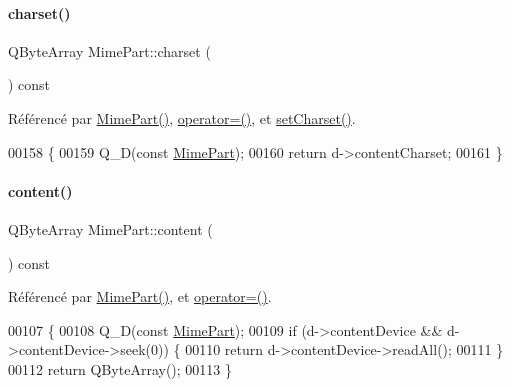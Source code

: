 \paragraph{\texorpdfstring{charset()}{charset()}}
{\footnotesize\ttfamily Q\+Byte\+Array Mime\+Part\+::charset (\begin{DoxyParamCaption}{ }\end{DoxyParamCaption}) const}



Référencé par \hyperlink{class_simple_mail_1_1_mime_part_a22b25ea7c1bb06d1b73f4c43103bfa1e}{Mime\+Part()}, \hyperlink{class_simple_mail_1_1_mime_part_a34320574f8cba9dbe03cca99e3fca942}{operator=()}, et \hyperlink{class_simple_mail_1_1_mime_part_a3ec15032385ee5687112e2e808d6170f}{set\+Charset()}.


\begin{DoxyCode}
00158 \{
00159     Q\_D(\textcolor{keyword}{const} \hyperlink{class_simple_mail_1_1_mime_part}{MimePart});
00160     \textcolor{keywordflow}{return} d->contentCharset;
00161 \}
\end{DoxyCode}
\mbox{\label{class_simple_mail_1_1_mime_part_a22fd1bc02bce6c9655d879fd71620bf5}} 
\paragraph{\texorpdfstring{content()}{content()}}
{\footnotesize\ttfamily Q\+Byte\+Array Mime\+Part\+::content (\begin{DoxyParamCaption}{ }\end{DoxyParamCaption}) const}



Référencé par \hyperlink{class_simple_mail_1_1_mime_part_a22b25ea7c1bb06d1b73f4c43103bfa1e}{Mime\+Part()}, et \hyperlink{class_simple_mail_1_1_mime_part_a34320574f8cba9dbe03cca99e3fca942}{operator=()}.


\begin{DoxyCode}
00107 \{
00108     Q\_D(\textcolor{keyword}{const} \hyperlink{class_simple_mail_1_1_mime_part}{MimePart});
00109     \textcolor{keywordflow}{if} (d->contentDevice && d->contentDevice->seek(0)) \{
00110         \textcolor{keywordflow}{return} d->contentDevice->readAll();
00111     \}
00112     \textcolor{keywordflow}{return} QByteArray();
00113 \}
\end{DoxyCode}
\mbox{\label{class_simple_mail_1_1_mime_part_abbe3a57832537bf93b12b1cd9924024a}} 
